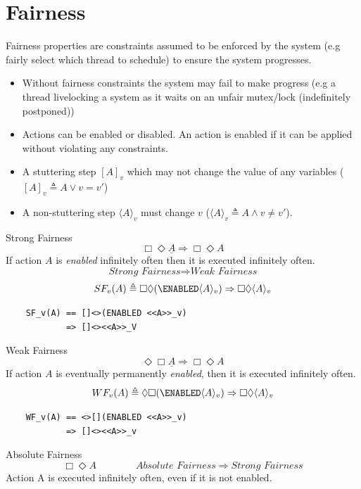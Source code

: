 \section{Fairness}
Fairness properties are constraints assumed to be enforced by the system (e.g fairly select which thread to schedule) to ensure the system progresses.
\begin{itemize}
    \item Without fairness constraints the system may fail to make progress (e.g a thread livelocking a system as it waits on an unfair mutex/lock (indefinitely postponed))
    \item Actions can be enabled or disabled. An action is enabled if it can be applied without violating any constraints.
    \item A stuttering step $[A]_v$ which may not change the value of any variables ($[A]_v \triangleq A \lor v = v'$)
    \item A non-stuttering step $\langle A \rangle_v$ must change $v$ ($\langle A \rangle_v \triangleq A \land v \neq v'$).
\end{itemize}
\begin{tcbraster}[raster columns=2,raster equal height]
    \begin{definitionbox}{Strong Fairness}
        \[\Box \Diamond \underline{A} \Rightarrow \Box \Diamond A\]
        If action $A$ is \textit{enabled} infinitely often then it is executed infinitely often.
        \[\textit{Strong Fairness} \Rightarrow \textit{Weak Fairness}\]
        \[SF_v(A) \triangleq \Box \Diamond (\ENABLED \langle A \rangle_v) \Rightarrow \Box \Diamond \langle A \rangle_v\]    
        \begin{verbatim}
    SF_v(A) == []<>(ENABLED <<A>>_v) 
            => []<><<A>>_V
        \end{verbatim}
    \end{definitionbox}
    \begin{definitionbox}{Weak Fairness}
        \[\Diamond \Box \underline{A} \Rightarrow \Box \Diamond A\]
        If action $A$ is eventually permanently \textit{enabled}, then it is executed infinitely often.
        \[\]
        \[WF_v(A) \triangleq \Diamond \Box (\ENABLED \langle A \rangle_v) \Rightarrow \Box \Diamond \langle A \rangle_v\]
        \begin{verbatim}
    WF_v(A) == <>[](ENABLED <<A>>_v) 
            => []<><<A>>_v
        \end{verbatim}
    \end{definitionbox}
\end{tcbraster}
\begin{definitionbox}{Absolute Fairness}
    \[\Box\Diamond A \qquad \qquad \textit{Absolute Fairness} \Rightarrow \textit{Strong Fairness}\]
    Action A is executed infinitely often, even if it is not enabled.
\end{definitionbox}

